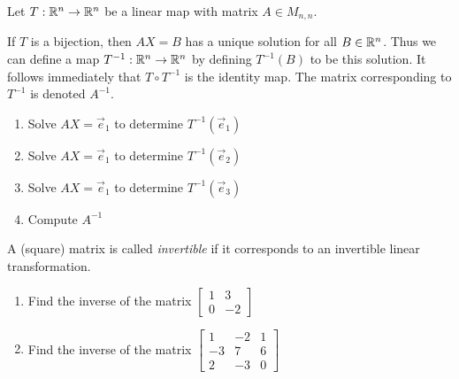 
\begin{applicationActivities}{3}{23}

\begin{activity}{0}
  Let $T: \mathbb{R}^n \rightarrow \mathbb{R}^n$ be a linear map with matrix $A \in M_{n,n}$.

  If $T$ is a bijection, then $AX=B$ has a unique solution for all $B \in \mathbb{R}^n$.  Thus we can define a map $T^{-1} : \mathbb{R}^n \rightarrow \mathbb{R}^n$ by defining $T^{-1}(B)$ to be this solution.  It follows immediately that $T \circ T^{-1}$ is the identity map.  The matrix corresponding to $T^{-1}$ is denoted $A^{-1}$.

  \begin{enumerate}[1)]
  \item Solve $AX=\vec{e}_1$ to determine $T^{-1}(\vec{e}_1)$
  \item Solve $AX=\vec{e}_1$ to determine $T^{-1}(\vec{e}_2)$
  \item Solve $AX=\vec{e}_1$ to determine $T^{-1}(\vec{e}_3)$
  \item Compute $A^{-1}$
  \end{enumerate}

  A (square) matrix is called {\em invertible} if it corresponds to an invertible linear transformation.

  \begin{enumerate}[1)]
  \item Find the inverse of the matrix $\begin{bmatrix} 1 & 3 \\ 0 & -2 \end{bmatrix}$
  \item Find the inverse of the matrix $\begin{bmatrix} 1 & -2 & 1 \\ -3 & 7 & 6 \\ 2 & -3 & 0 \end{bmatrix}$
  \end{enumerate}
\end{activity}

\end{applicationActivities}
